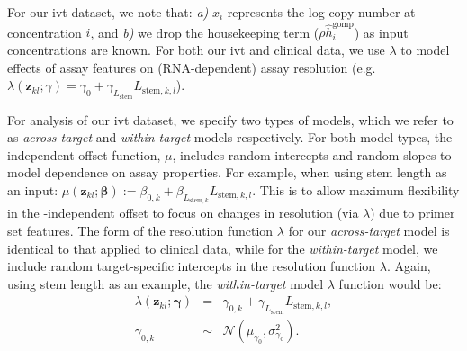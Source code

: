 \documentclass[../thesis.tex]{subfiles}
\begin{document}
For our \gls{ivt}  dataset, we note that: \emph{a)} $x_{i}$ represents the log  copy number at concentration $i$, and \emph{b)} we drop the housekeeping term ($\rho\hat{h}^{\text{gomp}}_{i}$) as input  concentrations are known. For both our \gls{ivt}  and clinical data, we use $\lambda$ to model effects of assay features on (RNA-dependent) assay resolution (e.g. $\lambda(\bm{z}_{kl}; \gamma) = \gamma_{0} + \gamma_{L_{\text{stem}}} L_{\text{stem},k,l}$).

For analysis of our \gls{ivt}  dataset, we specify two types of models, which we refer to as \emph{across-target} and \emph{within-target} models respectively. 
For both model types, the -independent offset function, $\mu$, includes random intercepts and random slopes to model dependence on assay properties. For example, when using stem length as an input: $\mu(\bm{z}_{kl}; \bm{\beta}) := \beta_{0,k} + \beta_{L_{\text{stem},k}} L_{\text{stem},k,l}$. This is to allow maximum flexibility in the -independent offset to focus on changes in resolution (via $\lambda$) due to primer set features.
The form of the resolution function $\lambda$ for our \emph{across-target} model is identical to that applied to clinical data, while for the \emph{within-target} model, we include random target-specific intercepts in the resolution function $\lambda$. Again, using stem length as an example, the \emph{within-target} model $\lambda$ function would be:
\begin{eqnarray}
\lambda(\bm{z}_{kl}; \bm{\gamma}) &=& \gamma_{0,k} + \gamma_{L_{\text{stem}}} L_{\text{stem},k,l}, \\
\gamma_{0,k} &\sim&  \mathcal{N}(\mu_{\gamma_{0}}, \sigma^{2}_{\gamma_{0}}).    
\end{eqnarray}
\end{document}
